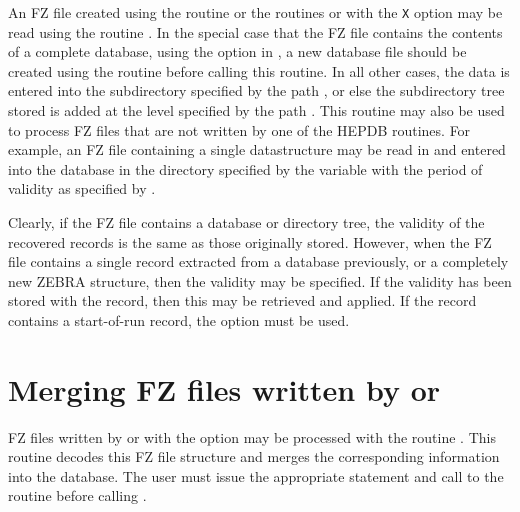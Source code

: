 An FZ file created using the routine  or the routines
 or  with the {\tt X} option may
be read using the routine .
In the special case that the FZ file contains the contents of a complete database,
using the option  in , a new database file should be
created using the routine  before calling this routine.
In all other cases, the data is entered into the subdirectory specified
by the path , or else the subdirectory tree stored is added
at the level specified by the path .
This routine may also be used to process FZ files that are not written
by one of the HEPDB routines. For example, an FZ file containing a single
datastructure may be read in and entered into the database in the directory
specified by the variable 
with the period of validity as specified by .

Clearly, if the FZ file contains a database or directory tree, the
validity of the recovered records is the same as those originally
stored. However, when the FZ file contains a single record extracted
from a database previously, or a completely new ZEBRA structure, then
the validity may be specified. If the validity has been stored with the
record, then this may be retrieved and applied. If the record contains
a start-of-run record, the option  must be used.

\newpage
{}
\section{Merging FZ files written by \protect{} or \protect{}}

FZ files written by  or  with the
option  may be processed with the routine .
This routine decodes this FZ file structure and merges the
corresponding information into the database. The user must issue
the appropriate  statement and call to the routine 
before calling .


